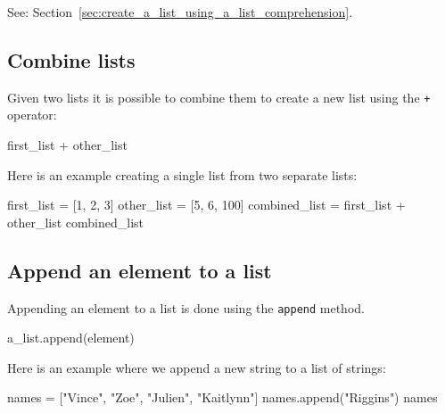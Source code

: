 See: Section~\ref{sec:create_a_list_using_a_list_comprehension}.


\subsection{Combine lists}

Given two lists it is possible to combine them to create a new list using the \texttt{+} operator:


\begin{api}
first_list + other_list
\end{api}



Here is an example creating a single list from two separate lists:




\begin{pyin}
first_list = [1, 2, 3]
other_list = [5, 6, 100]
combined_list = first_list + other_list
combined_list
\end{pyin}





\begin{raw}
[1, 2, 3, 5, 6, 100]
\end{raw}





\subsection{Append an element to a list}

Appending an element to a list is done using the \texttt{append} method.


\begin{api}
a_list.append(element)
\end{api}



Here is an example where we append a new string to a list of strings:




\begin{pyin}
names = ["Vince", "Zoe", "Julien", "Kaitlynn"]
names.append("Riggins")
names
\end{pyin}





\begin{raw}
\end{raw}


